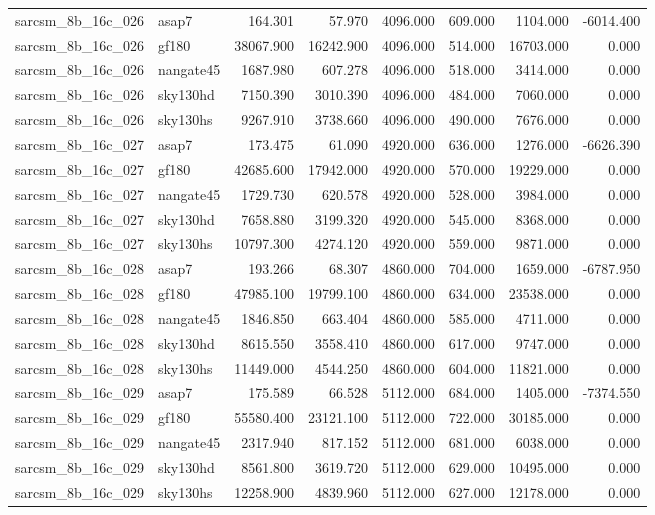 \begin{tabular}{llrrrrrr}
sarcsm\_8b\_16c\_026 & asap7 & 164.301 & 57.970 & 4096.000 & 609.000 & 1104.000 & -6014.400 \\
sarcsm\_8b\_16c\_026 & gf180 & 38067.900 & 16242.900 & 4096.000 & 514.000 & 16703.000 & 0.000 \\
sarcsm\_8b\_16c\_026 & nangate45 & 1687.980 & 607.278 & 4096.000 & 518.000 & 3414.000 & 0.000 \\
sarcsm\_8b\_16c\_026 & sky130hd & 7150.390 & 3010.390 & 4096.000 & 484.000 & 7060.000 & 0.000 \\
sarcsm\_8b\_16c\_026 & sky130hs & 9267.910 & 3738.660 & 4096.000 & 490.000 & 7676.000 & 0.000 \\
sarcsm\_8b\_16c\_027 & asap7 & 173.475 & 61.090 & 4920.000 & 636.000 & 1276.000 & -6626.390 \\
sarcsm\_8b\_16c\_027 & gf180 & 42685.600 & 17942.000 & 4920.000 & 570.000 & 19229.000 & 0.000 \\
sarcsm\_8b\_16c\_027 & nangate45 & 1729.730 & 620.578 & 4920.000 & 528.000 & 3984.000 & 0.000 \\
sarcsm\_8b\_16c\_027 & sky130hd & 7658.880 & 3199.320 & 4920.000 & 545.000 & 8368.000 & 0.000 \\
sarcsm\_8b\_16c\_027 & sky130hs & 10797.300 & 4274.120 & 4920.000 & 559.000 & 9871.000 & 0.000 \\
sarcsm\_8b\_16c\_028 & asap7 & 193.266 & 68.307 & 4860.000 & 704.000 & 1659.000 & -6787.950 \\
sarcsm\_8b\_16c\_028 & gf180 & 47985.100 & 19799.100 & 4860.000 & 634.000 & 23538.000 & 0.000 \\
sarcsm\_8b\_16c\_028 & nangate45 & 1846.850 & 663.404 & 4860.000 & 585.000 & 4711.000 & 0.000 \\
sarcsm\_8b\_16c\_028 & sky130hd & 8615.550 & 3558.410 & 4860.000 & 617.000 & 9747.000 & 0.000 \\
sarcsm\_8b\_16c\_028 & sky130hs & 11449.000 & 4544.250 & 4860.000 & 604.000 & 11821.000 & 0.000 \\
sarcsm\_8b\_16c\_029 & asap7 & 175.589 & 66.528 & 5112.000 & 684.000 & 1405.000 & -7374.550 \\
sarcsm\_8b\_16c\_029 & gf180 & 55580.400 & 23121.100 & 5112.000 & 722.000 & 30185.000 & 0.000 \\
sarcsm\_8b\_16c\_029 & nangate45 & 2317.940 & 817.152 & 5112.000 & 681.000 & 6038.000 & 0.000 \\
sarcsm\_8b\_16c\_029 & sky130hd & 8561.800 & 3619.720 & 5112.000 & 629.000 & 10495.000 & 0.000 \\
sarcsm\_8b\_16c\_029 & sky130hs & 12258.900 & 4839.960 & 5112.000 & 627.000 & 12178.000 & 0.000 \\

\end{tabular}
